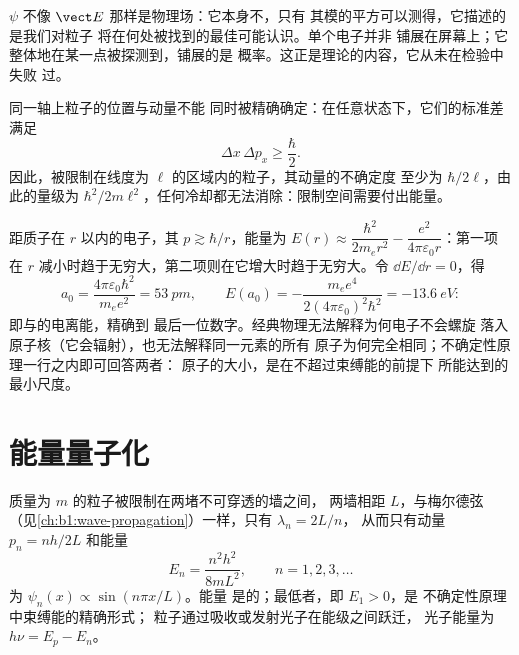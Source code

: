 \begin{remark}[什么在波动]\label{rem:b1:quantum-introduction:whatwaves}
$\psi$ 不像 $\vect E$ 那样是物理场：它本身不，只有
其模的平方可以测得，它描述的是我们对粒子
将在何处被找到的最佳可能认识。单个电子并非
铺展在屏幕上；它整体地在某一点被探测到，铺展的是
概率。这正是理论的内容，它从未在检验中失败
过。
\end{remark}

\begin{theorem}[海森堡不确定性原理]\label{thm:b1:quantum-introduction:heisenberg}
同一轴上粒子的位置与动量不能
同时被精确确定：在任意状态下，它们的标准差满足
\[
\Delta x\,\Delta p_x \geq \frac{\hbar}{2} .
\]
因此，被限制在线度为 $\ell$ 的区域内的粒子，其动量的不确定度
至少为 $\hbar/2\ell$，由此的量级为
$\hbar^2/2m\ell^2$，任何冷却都无法消除：限制空间需要付出能量。
\end{theorem}
\admitted

\begin{example}[氢原子的大小]\label{ex:b1:quantum-introduction:hsize}
距质子在 $r$ 以内的电子，其 $p \gtrsim \hbar/r$，能量为
$E(r) \approx \dfrac{\hbar^2}{2m_er^2} - \dfrac{e^2}{4\pi\varepsilon_0r}$：第一项
在 $r$ 减小时趋于无穷大，第二项则在它增大时趋于无穷大。令 $\dd E/\dd r = 0$，得
\[
a_0 = \frac{4\pi\varepsilon_0\hbar^2}{m_ee^2} = \qty{53}{pm} , \qquad
E(a_0) = -\frac{m_ee^4}{2(4\pi\varepsilon_0)^2\hbar^2} = \qty{-13.6}{eV} :
\]
即\emph{}与的电离能，精确到
最后一位数字。经典物理无法解释为何电子不会螺旋
落入原子核（它会辐射），也无法解释同一元素的所有
原子为何完全相同；不确定性原理一行之内即可回答两者：
原子的大小，是在不超过束缚能的前提下
所能达到的最小尺度。
\end{example}

\section{能量量子化}

\begin{proposition}[箱中粒子]\label{prop:b1:quantum-introduction:box}
质量为 $m$ 的粒子被限制在两堵不可穿透的墙之间，
两墙相距 $L$，与梅尔德弦
（见\cref{ch:b1:wave-propagation}）一样，只有 $\lambda_n = 2L/n$，
从而只有动量 $p_n = nh/2L$ 和能量
\[
E_n = \frac{n^2h^2}{8mL^2} , \qquad n = 1, 2, 3, \ldots
\]
为 $\psi_n(x) \propto \sin(n\pi x/L)$。能量
是\emph{}的；最低者，即\emph{} $E_1 > 0$，是
不确定性原理中束缚能的精确形式；
粒子通过吸收或发射光子在能级之间跃迁，
光子能量为 $h\nu = E_p - E_n$。
\end{proposition}

